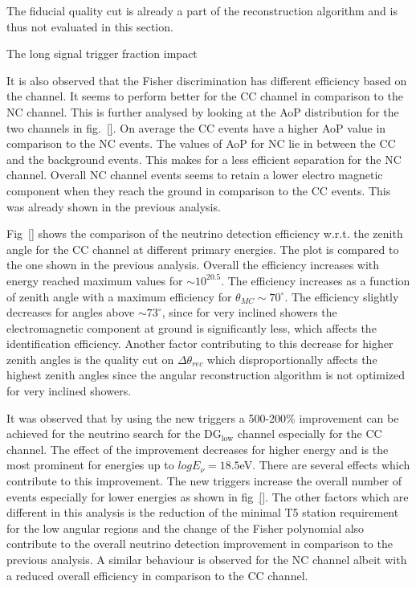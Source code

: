 The fiducial quality cut is already a part of the reconstruction algorithm and is thus not evaluated in this section.

The long signal trigger fraction impact 

It is also observed that the Fisher discrimination has different efficiency based on the channel. It seems to perform better for the CC channel in comparison to the NC channel. This is further analysed by looking at the AoP distribution for the two channels in fig.~\ref{}. On average the CC events have a higher AoP value in comparison to the NC events. The values of AoP for NC lie in between the CC and the background events. This makes for a less efficient separation for the NC channel. Overall NC channel events seems to retain a lower electro magnetic component when they reach the ground in comparison to the CC events. This was already shown in the previous analysis.

Fig~\ref{} shows the comparison of the neutrino detection efficiency w.r.t. the zenith angle for the CC channel at different primary energies. The plot is compared to the one shown in the previous analysis. Overall the efficiency increases with energy reached maximum values for $\sim 10^{20.5}$. The efficiency increases as a function of zenith angle with a maximum efficiency for $\theta_{MC} \sim 70^{\circ}$. The efficiency slightly decreases for angles above $ \sim 73^{\circ}$, since for very inclined showers the electromagnetic component at ground is significantly less, which affects the identification efficiency. Another factor contributing to this decrease for higher zenith angles is the quality cut on $\Delta \theta_{rec}$ which disproportionally affects the highest zenith angles since the angular reconstruction algorithm is not optimized for very inclined showers. 

It was observed that by using the new triggers a 500-200\% improvement can be achieved for the neutrino search for the DG$\mathrm{_{low}}$ channel especially for the CC channel. The effect of the improvement decreases for higher energy and is the most prominent for energies up to $log E_{\nu} = 18.5$eV. There are several effects which contribute to this improvement. The new triggers increase the overall number of events especially for lower energies as shown in fig~\ref{}. The other factors which are different in this analysis is the reduction of the minimal T5 station requirement for the low angular regions and the change of the Fisher polynomial also contribute to the overall neutrino detection improvement in comparison to the previous analysis. A similar behaviour is observed for the NC channel albeit with a reduced overall efficiency in comparison to the CC channel. 




